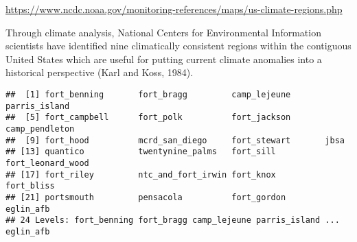 \documentclass[
]{article}
\newenvironment{Shaded}{\begin{snugshade}}{\end{snugshade}}
\newcommand{\NormalTok}[1]{#1}
\newcommand{\SpecialCharTok}[1]{\textcolor[rgb]{0.00,0.00,0.00}{#1}}
\begin{document}
\url{https://www.ncdc.noaa.gov/monitoring-references/maps/us-climate-regions.php}

Through climate analysis, National Centers for Environmental Information
scientists have identified nine climatically consistent regions within
the contiguous United States which are useful for putting current
climate anomalies into a historical perspective (Karl and Koss, 1984).

\begin{Shaded}
\end{Shaded}

\begin{verbatim}
##  [1] fort_benning       fort_bragg         camp_lejeune       parris_island     
##  [5] fort_campbell      fort_polk          fort_jackson       camp_pendleton    
##  [9] fort_hood          mcrd_san_diego     fort_stewart       jbsa              
## [13] quantico           twentynine_palms   fort_sill          fort_leonard_wood 
## [17] fort_riley         ntc_and_fort_irwin fort_knox          fort_bliss        
## [21] portsmouth         pensacola          fort_gordon        eglin_afb         
## 24 Levels: fort_benning fort_bragg camp_lejeune parris_island ... eglin_afb
\end{verbatim}
\end{document}

